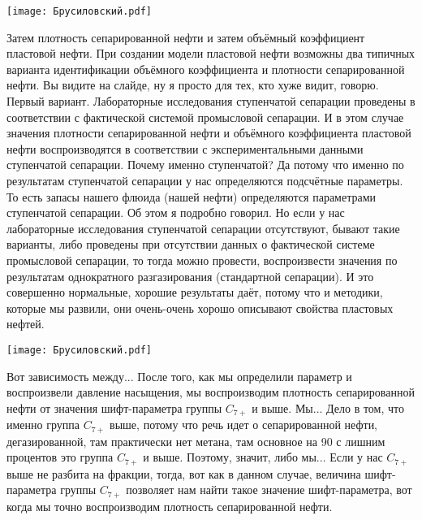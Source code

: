 \documentclass[main.tex]{subfiles}
\begin{document}
\begin{center}
\texttt{[image: Брусиловский.pdf]}
\end{center}

Затем плотность сепарированной нефти и затем объёмный коэффициент пластовой нефти.
При создании модели пластовой нефти возможны два типичных варианта идентификации объёмного коэффициента и плотности сепарированной нефти.
Вы видите на слайде, ну я просто для тех, кто хуже видит, говорю.
Первый вариант.
Лабораторные исследования ступенчатой сепарации проведены в соответствии с фактической системой промысловой сепарации.
И в этом случае значения плотности сепарированной нефти и объёмного коэффициента пластовой нефти воспроизводятся в соответствии с экспериментальными данными ступенчатой сепарации.
Почему именно ступенчатой?
Да потому что именно по результатам ступенчатой сепарации у нас определяются подсчётные параметры.
То есть запасы нашего флюида (нашей нефти) определяются параметрами ступенчатой сепарации.
Об этом я подробно говорил.
Но если у нас лабораторные исследования ступенчатой сепарации отсутствуют, бывают такие варианты, либо проведены при отсутствии данных о фактической системе промысловой сепарации, то тогда можно провести, воспроизвести значения по результатам однократного разгазирования (стандартной сепарации).
И это совершенно нормальные, хорошие результаты даёт, потому что и методики, которые мы развили, они очень-очень хорошо описывают свойства пластовых нефтей.

\begin{center}
\texttt{[image: Брусиловский.pdf]}
\end{center}

Вот зависимость между...
После того, как мы определили параметр и воспроизвели давление насыщения, мы воспроизводим плотность сепарированной нефти от значения шифт-параметра группы $C_{7+}$ и выше.
Мы...
Дело в том, что именно группа $C_{7+}$ выше, потому что речь идет о сепарированной нефти, дегазированной, там практически нет метана, там основное на 90 с лишним процентов это группа $C_{7+}$ и выше.
Поэтому, значит, либо мы...
Если у нас $C_{7+}$ выше не разбита на фракции, тогда, вот как в данном случае, величина шифт-параметра группы $C_{7+}$ позволяет нам найти такое значение шифт-параметра, вот когда мы точно воспроизводим плотность сепарированной нефти.
\end{document}
